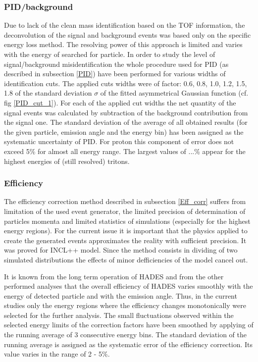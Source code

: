 \subsubsection{\label{pid/back} PID/background}

Due to lack of the clean mass identification based on the TOF information,  
the deconvolution of the signal and background events was based only on the specific energy loss method.
The resolving power of this approach is limited and varies with the energy of searched for particle.
In order to study the level of signal/background misidentification the whole procedure used for PID (as described 
in subsection \ref{PID}) have been performed for various widths of identification cuts. The applied cuts widths were of factor: 
0.6, 0.8, 1.0, 1.2, 1.5, 1.8 of the standard deviation $\sigma$ of the fitted asymmetrical Gaussian function (cf. fig \ref{PID_cut_1}). 
For each of the applied cut widths the net quantity of the signal events was calculated by subtraction of the background 
contribution from the signal one. 
The standard deviation of the average of all obtained results (for the given particle, emission angle and the energy bin) has been 
assigned as the systematic uncertainty of PID. For proton this component of error does not exceed 5\% for almost all energy range.  
The largest values of ...\% 
appear for the highest energies of (still resolved) tritons.

\subsubsection{\label{eff} Efficiency}

The efficiency correction method described in subsection \ref{Eff_corr} suffers from limitation 
of the used event generator, the limited precision of determination of particles momenta 
and limited statistics of simulations (especially for the highest energy regions). For the current issue 
it is important that the physics applied to create the generated events approximates 
the reality with sufficient precision. It was proved for INCL++ model. Since the method consists 
in dividing of two simulated distributions the effects of minor defficiencies of the model cancel out. 

It is known from the long term operation of HADES and from the other performed analyses 
that the overall efficiency of HADES 
varies smoothly with the energy of detected particle and with the emission angle. 
Thus, in the current studies only the energy regions where the efficiency changes 
monotonically were selected for the further analysis. 
The small fluctuations observed within the selected energy limits 
of the correction factors have been smoothed by applying of the running average 
of 3 consecutive energy bins. The standard deviation of the running average is assigned 
as the systematic error of the efficiency correction. 
Its value varies in the range of 2 - 5\%.

